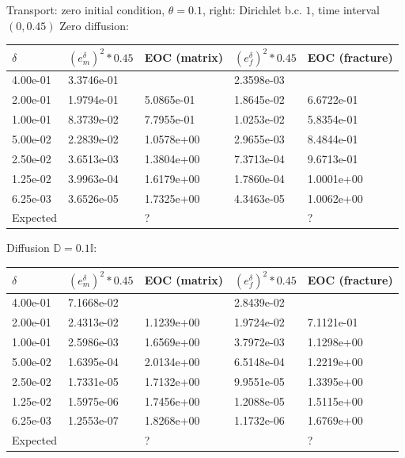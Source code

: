 \documentclass[a4paper]{article}
\def\tn#1{{\mathbb{#1}}}    %
\begin{document}
Transport: zero initial condition, $\theta=0.1$, right: Dirichlet b.c. $1$, time interval $(0,0.45)$
Zero diffusion:

\begin{tabular}{|l|ll|ll|}
\hline
$\delta$ & $(e_m^\delta)^2*0.45$ & EOC (matrix) & $(e_f^\delta)^2*0.45$ & EOC (fracture)\\
\hline
4.00e-01 & 3.3746e-01 &            & 2.3598e-03 &           \\ 
2.00e-01 & 1.9794e-01 & 5.0865e-01 & 1.8645e-02 & 6.6722e-01\\  
1.00e-01 & 8.3739e-02 & 7.7955e-01 & 1.0253e-02 & 5.8354e-01\\
5.00e-02 & 2.2839e-02 & 1.0578e+00 & 2.9655e-03 & 8.4844e-01\\
2.50e-02 & 3.6513e-03 & 1.3804e+00 & 7.3713e-04 & 9.6713e-01\\
1.25e-02 & 3.9963e-04 & 1.6179e+00 & 1.7860e-04 & 1.0001e+00\\
6.25e-03 & 3.6526e-05 & 1.7325e+00 & 4.3463e-05 & 1.0062e+00\\
\hline
Expected & & ? & & ?\\
\hline
\end{tabular}

Diffusion $\tn D=0.1\tn I$:

\begin{tabular}{|l|ll|ll|}
\hline
$\delta$ & $(e_m^\delta)^2*0.45$ & EOC (matrix) & $(e_f^\delta)^2*0.45$ & EOC (fracture)\\
\hline
4.00e-01 & 7.1668e-02 &            & 2.8439e-02 &            \\
2.00e-01 & 2.4313e-02 & 1.1239e+00 & 1.9724e-02 & 7.1121e-01 \\
1.00e-01 & 2.5986e-03 & 1.6569e+00 & 3.7972e-03 & 1.1298e+00 \\
5.00e-02 & 1.6395e-04 & 2.0134e+00 & 6.5148e-04 & 1.2219e+00 \\
2.50e-02 & 1.7331e-05 & 1.7132e+00 & 9.9551e-05 & 1.3395e+00 \\
1.25e-02 & 1.5975e-06 & 1.7456e+00 & 1.2088e-05 & 1.5115e+00 \\
6.25e-03 & 1.2553e-07 & 1.8268e+00 & 1.1732e-06 & 1.6769e+00 \\
\hline
Expected & & ? & & ?\\
\hline
\end{tabular}


%





\end{document}
